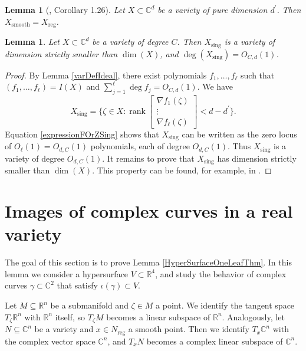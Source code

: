 \documentclass[letterpaper, reqno,11pt]{article}
\newtheorem{lemma}[theorem]{Lemma}
\theoremstyle{remark}
\newcommand{\RR}{\mathbb{R}}
\newcommand{\CC}{\mathbb{C}}
\newcommand{\smooth}{\operatorname{smooth}}
\newcommand{\sing}{\operatorname{sing}}
\newcommand{\reg}{\operatorname{reg}}
\begin{document}
\begin{lemma}[\cite{mumford}, Corollary 1.26]\label{equivalenceOfSmoothSing}
Let $X\subset\CC^d$ be a variety of pure dimension $d^\prime$. Then $X_{\smooth}=X_{\reg}$.
\end{lemma}

\begin{lemma} \label{le:singular}
Let $X\subset\CC^d$ be a variety of degree $C$. Then $X_{\sing}$ is a variety of dimension strictly smaller than $\dim(X)$, and $\deg(X_{\sing})=O_{C,d}(1)$.
\end{lemma}
\begin{proof}
By Lemma \ref{varDefIdeal}, there exist polynomials $f_1,\ldots,f_{\ell}$ such that $(f_1,\ldots,f_{\ell})=I(X)$ and $\sum_{j=1}^{\ell} \deg f_j = O_{C,d}(1)$. We have
\begin{equation}\label{expressionFOrZSing}
X_{\sing}= \bigg\{\zeta\in X\colon \operatorname{rank}\left[\begin{array}{c}\nabla f_1(\zeta)\\ \vdots \\ \nabla f_\ell(\zeta)\end{array}\right]<d-d^\prime\bigg\}.
\end{equation}
Equation \eqref{expressionFOrZSing} shows that $X_{\sing}$ can be written as the zero locus of $O_{\ell}(1)=O_{d,C}(1)$ polynomials, each of degree $O_{d,C}(1)$. Thus $X_{\sing}$ is a variety of degree $O_{d,C}(1)$. It remains to prove that $X_{\sing}$ has dimension strictly smaller than $\dim(X)$. This property can be found, for example, in \cite[Chapter I, Theorem 5.3]{hartshorne}.
\end{proof}


%
\section{Images of complex curves in a real variety} \label{sec:TangentBundle}

The goal of this section is to prove Lemma \ref{HyperSurfaceOneLeafThm}.
In this lemma we consider a hypersurface $V \subset \RR^4$, and study the behavior of complex curves $\gamma \subset \CC^2$ that satisfy $\iota(\gamma) \subset V$.

Let $M\subseteq\RR^n$ be a submanifold and $\zeta\in M$ a point.
We identify the tangent space $T_\zeta\RR^n$ with $\RR^n$ itself,
so $T_\zeta M$ becomes a linear subspace of $\RR^n$.
Analogously, let $N\subseteq\CC^n$ be a variety and
$x\in N_{\reg}$ a smooth point.
Then we identify $T_x\CC^n$ with the complex vector space $\CC^n$,
and $T_xN$ becomes a complex linear subspace of $\CC^n$.
\end{document}
